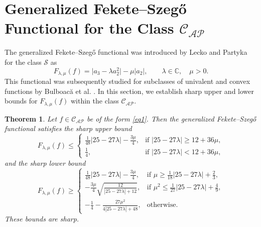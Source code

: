 \documentclass[11pt]{article}
\newtheorem{theo}{Theorem}[section]
\numberwithin{equation}{section}
\begin{document}
\section{Generalized Fekete--Szeg\H{o} Functional for the Class $\mathcal{C}_{\mathcal{AP}}$}
The generalized Fekete--Szeg\H{o} functional was introduced by Lecko and Partyka \cite{Lecko2024} for the class $\mathcal{S}$ as
\begin{equation}\label{FG}
F_{\lambda,\mu}(f) = \big|a_3-\lambda a_2^2\big| - \mu |a_2|, \qquad \lambda\in\mathbb{C}, \quad \mu>0.
\end{equation}
This functional was subsequently studied for subclasses of univalent and convex functions by Bulboac\u{a} et al. \cite{Bulboaca2025}. In this section, we establish sharp upper and lower bounds for $F_{\lambda,\mu}(f)$ within the class $\mathcal{C}_{\mathcal{AP}}$.

\begin{theo}\label{T4}
Let $f \in \mathcal{C}_{\mathcal{AP}}$ be of the form \eqref{eq1}. Then the generalized Fekete--Szeg\H{o} functional satisfies the sharp upper bound
\[
F_{\lambda,\mu}(f) \le 
\begin{cases}
\displaystyle \frac{1}{48} |25 - 27\lambda| - \frac{3\mu}{4}, & \text{if } \displaystyle |25 - 27\lambda| \ge 12 + 36\mu, \\[4mm]
\displaystyle \frac{1}{4}, & \text{if } \displaystyle |25 - 27\lambda| < 12 + 36\mu,
\end{cases}
\]
and the sharp lower bound
\[
F_{\lambda,\mu}(f) \ge 
\begin{cases}
\displaystyle \frac{1}{48} |25 - 27\lambda| - \frac{3\mu}{4}, & \text{if } \displaystyle \mu \ge \frac{1}{18} |25 - 27\lambda| + \frac{2}{3}, \\[4mm]
\displaystyle -\frac{3\mu}{4} \sqrt{ \frac{12}{|25 - 27\lambda| + 12} }, & \text{if } \displaystyle \mu^2 \le \frac{1}{27} |25 - 27\lambda| + \frac{4}{9}, \\[5mm]
\displaystyle -\frac{1}{4} - \frac{27\mu^2}{4 |25 - 27\lambda| + 48}, & \text{otherwise}.
\end{cases}
\]
These bounds are sharp.
\end{theo}
\end{document}

